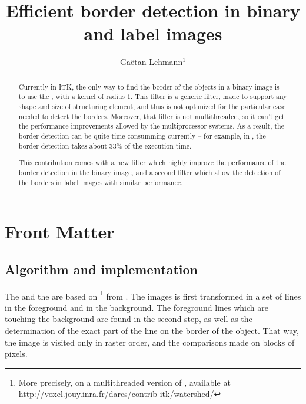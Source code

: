 \documentclass{InsightArticle}
\title{Efficient border detection in binary and label images}
\author{Ga\"etan Lehmann{$^1$}}
\begin{document}
\maketitle

\ifhtml
\chapter*{Front Matter\label{front}}
\fi


\begin{abstract}
\noindent
Currently in ITK, the only way to find the border of the objects in a binary image is to use the , with a kernel of radius $1$. This filter is a generic filter, made to support any shape and size of structuring element, and thus is not optimized for the particular case needed to detect the borders. Moreover, that filter is not multithreaded, so it can't get the performance improvements allowed by the multiprocessor systems. As a result, the border detection can be quite time consumming currently -- for example, in , the border detection takes about 33\% of the execution time.

This contribution comes with a new filter which highly improve the performance of the border detection in the binary image, and a second filter which allow the detection of the borders in label images with similar performance.

\end{abstract}


\section{Algorithm and implementation}

The  and the  are based on \footnote{More precisely, on a multithreaded version of , available at \\ \url{http://voxel.jouy.inra.fr/darcs/contrib-itk/watershed/}} from \cite{Beare:2006p42}. The images is first transformed in a set of lines in the foreground and in the background. The foreground lines which are touching the background are found in the second step, as well as the determination of the exact part of the line on the border of the object. That way, the image is visited only in raster order, and the comparisons made on blocks of pixels.
\end{document}
